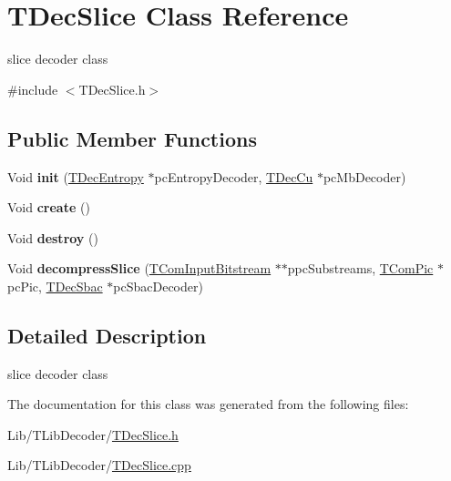\hypertarget{class_t_dec_slice}{}\section{T\+Dec\+Slice Class Reference}
\label{class_t_dec_slice}


slice decoder class  




{\ttfamily \#include $<$T\+Dec\+Slice.\+h$>$}

\subsection*{Public Member Functions}
{\bf }\par
\begin{DoxyCompactItemize}
\item 
\mbox{\label{class_t_dec_slice_aa3e040afff45a768cb6a38b5d9e98d83}} 
Void {\bfseries init} (\hyperlink{class_t_dec_entropy}{T\+Dec\+Entropy} $\ast$pc\+Entropy\+Decoder, \hyperlink{class_t_dec_cu}{T\+Dec\+Cu} $\ast$pc\+Mb\+Decoder)
\item 
\mbox{\label{class_t_dec_slice_ae9b00e69d5511643b88d9771063b29fb}} 
Void {\bfseries create} ()
\item 
\mbox{\label{class_t_dec_slice_ae4074c3347ac6da8e0e5528219a2628f}} 
Void {\bfseries destroy} ()
\item 
\mbox{\label{class_t_dec_slice_aeec53bd552f942214581cbacb6756986}} 
Void {\bfseries decompress\+Slice} (\hyperlink{class_t_com_input_bitstream}{T\+Com\+Input\+Bitstream} $\ast$$\ast$ppc\+Substreams, \hyperlink{class_t_com_pic}{T\+Com\+Pic} $\ast$pc\+Pic, \hyperlink{class_t_dec_sbac}{T\+Dec\+Sbac} $\ast$pc\+Sbac\+Decoder)
\end{DoxyCompactItemize}



\subsection{Detailed Description}
slice decoder class 

The documentation for this class was generated from the following files\+:\begin{DoxyCompactItemize}
\item 
Lib/\+T\+Lib\+Decoder/\hyperlink{_t_dec_slice_8h}{T\+Dec\+Slice.\+h}\item 
Lib/\+T\+Lib\+Decoder/\hyperlink{_t_dec_slice_8cpp}{T\+Dec\+Slice.\+cpp}\end{DoxyCompactItemize}
